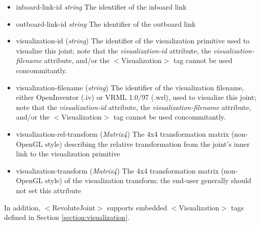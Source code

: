\documentclass{article}
\begin{document}
\begin{landscape}
\begin{itemize}
\begin{itemize}
\item inboard-link-id  \emph{string} The identifier of the inboard link
\item outboard-link-id  \emph{string} The identifier of the outboard link
\item visualization-id (\emph{string})  The identifier of the visualization primitive used to visualize this joint; note that the \emph{visualization-id} attribute, the \emph{visualization-filename} attribute, and/or the $<$Visualization$>$ tag cannot be used concommitantly.
\item visualization-filename (\emph{string})  The identifier of the visualization filename, either OpenInventor (.iv) or VRML 1.0/97 (.wrl), used to visualize this joint; note that the \emph{visualization-id} attribute, the \emph{visualization-filename} attribute, and/or the $<$Visualization$>$ tag cannot be used concommitantly.
\item visualization-rel-transform (\emph{Matrix4})  The 4x4 transformation matrix (non-OpenGL style) describing the relative transformation from the joint's inner link to the visualization primitive
\item visualization-transform (\emph{Matrix4})  The 4x4 transformation matrix (non-OpenGL style) of the visualization transform; the end-user generally should not set this attribute
\end{itemize}

In addition, $<$RevoluteJoint$>$ supports embedded $<$Visualization$>$ tags defined in Section \ref{section:visualization}.


\end{itemize}
\end{landscape}
\end{document}

